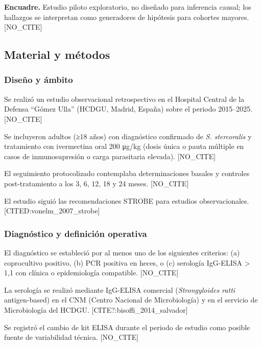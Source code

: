 \documentclass[
  spanish,
  12pt,
  a4paper,
]{article}
\begin{document}
\textbf{Encuadre.} Estudio piloto exploratorio, no diseñado para
inferencia causal; los hallazgos se interpretan como generadores de
hipótesis para cohortes mayores. {[}NO\_CITE{]}

\subsection*{Material y métodos}\label{material-y-muxe9todos}

\subsubsection{Diseño y ámbito}\label{diseuxf1o-y-uxe1mbito}

Se realizó un estudio observacional retrospectivo en el Hospital Central
de la Defensa ``Gómez Ulla'' (HCDGU, Madrid, España) sobre el periodo
2015--2025. {[}NO\_CITE{]}

Se incluyeron adultos (≥18 años) con diagnóstico confirmado de \emph{S.
stercoralis} y tratamiento con ivermectina oral 200 μg/kg (dosis única o
pauta múltiple en casos de inmunosupresión o carga parasitaria elevada).
{[}NO\_CITE{]}

El seguimiento protocolizado contemplaba determinaciones basales y
controles post-tratamiento a los 3, 6, 12, 18 y 24 meses. {[}NO\_CITE{]}

El estudio siguió las recomendaciones STROBE para estudios
observacionales. {[}CITED:vonelm\_2007\_strobe{]}

\subsubsection{Diagnóstico y definición
operativa}\label{diagnuxf3stico-y-definiciuxf3n-operativa}

El diagnóstico se estableció por al menos uno de los siguientes
criterios: (a) coprocultivo positivo, (b) PCR positiva en heces, o (c)
serología IgG-ELISA \textgreater{} 1,1 con clínica o epidemiología
compatible. {[}NO\_CITE{]}

La serología se realizó mediante IgG-ELISA comercial
(\emph{Strongyloides ratti} antigen-based) en el CNM (Centro Nacional de
Microbiología) y en el servicio de Microbiología del HCDGU.
{[}CITE?:bisoffi\_2014\_salvador{]}

Se registró el cambio de kit ELISA durante el periodo de estudio como
posible fuente de variabilidad técnica. {[}NO\_CITE{]}
\end{document}
